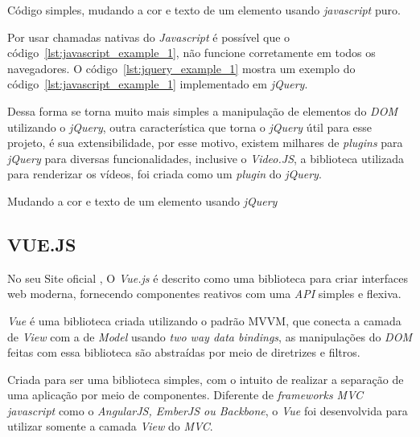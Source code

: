 \begin{listing}[htpb]
    \caption{Código simples, mudando a cor e texto de um elemento usando \textit{javascript} puro.}
    \label{lst:javascript_example_1}
\end{listing}

Por usar chamadas nativas do \textit{Javascript} é possível que o código~\ref{lst:javascript_example_1}, não funcione corretamente em todos os navegadores. O código~\ref{lst:jquery_example_1} mostra um exemplo do código~\ref{lst:javascript_example_1} implementado em \textit{jQuery}.

Dessa forma se torna muito mais simples a manipulação de elementos do \textit{DOM} utilizando o \textit{jQuery}, outra característica que torna o \textit{jQuery} útil para esse projeto, é sua extensibilidade, por esse motivo, existem milhares de \textit{plugins} para \textit{jQuery} para diversas funcionalidades, inclusive o \textit{Video.JS}, a biblioteca utilizada para renderizar os vídeos, foi criada como um \textit{plugin} do \textit{jQuery}.

\begin{listing}[H]
    \caption{Mudando a cor e texto de um elemento usando \textit{jQuery}}
    \label{lst:jquery_example_1}
\end{listing}

\subsection{VUE.JS}
\label{sec:vuejs}

No seu Site oficial , O \textit{Vue.js} é descrito como uma biblioteca para criar interfaces web moderna, fornecendo componentes reativos com uma \textit{API} simples e flexiva.

\textit{Vue} é uma biblioteca criada utilizando o padrão \ac{MVVM}, que conecta a camada de \textit{View} com a de \textit{Model} usando \textit{two way data bindings}, as manipulações do \textit{DOM} feitas com essa biblioteca são abstraídas por meio de diretrizes e filtros.

Criada para ser uma biblioteca simples, com o intuito de realizar a separação de uma aplicação por meio de componentes. Diferente de \textit{frameworks MVC javascript} como o \textit{AngularJS, EmberJS ou Backbone}, o \textit{Vue} foi desenvolvida para utilizar somente a camada \textit{View} do \textit{MVC}.

